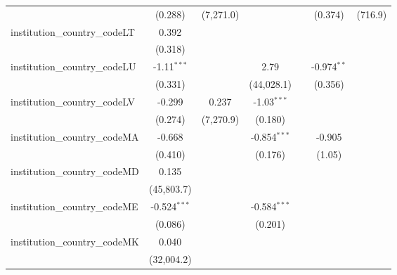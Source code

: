 \begin{tabular}{lcccccc}
                                         & (0.288)        & (7,271.0)     &                &                & (0.374)        & (716.9)\\   
   institution\_country\_codeLT          & 0.392          &               &                &                &                &   \\   
                                         & (0.318)        &               &                &                &                &   \\   
   institution\_country\_codeLU          & -1.11$^{***}$  &               & 2.79           &                & -0.974$^{**}$  &   \\   
                                         & (0.331)        &               & (44,028.1)     &                & (0.356)        &   \\   
   institution\_country\_codeLV          & -0.299         & 0.237         & -1.03$^{***}$  &                &                &   \\   
                                         & (0.274)        & (7,270.9)     & (0.180)        &                &                &   \\   
   institution\_country\_codeMA          & -0.668         &               & -0.854$^{***}$ &                & -0.905         &   \\   
                                         & (0.410)        &               & (0.176)        &                & (1.05)         &   \\   
   institution\_country\_codeMD          & 0.135          &               &                &                &                &   \\   
                                         & (45,803.7)     &               &                &                &                &   \\   
   institution\_country\_codeME          & -0.524$^{***}$ &               & -0.584$^{***}$ &                &                &   \\   
                                         & (0.086)        &               & (0.201)        &                &                &   \\   
   institution\_country\_codeMK          & 0.040          &               &                &                &                &   \\   
                                         & (32,004.2)     &               &                &                &                &   \\   

\end{tabular}
